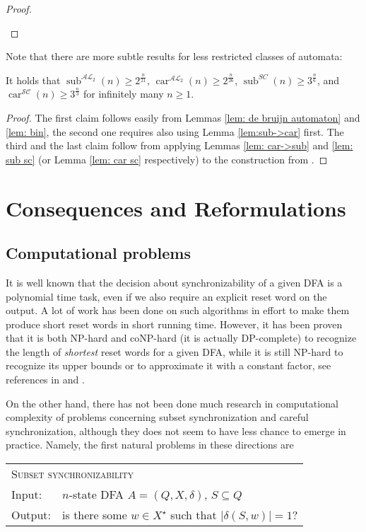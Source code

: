 \documentclass{ws-ijmpc}
\newcommand{\noun}[1]{\textsc{#1}}
\providecommand{\tabularnewline}{\\}
\DeclareMathOperator{\car}{car}
\DeclareMathOperator{\sub}{sub}
\begin{document}
\begin{proof}
\begin{romanlist}
\end{romanlist}
\end{proof}
Note that there are more subtle results for less restricted classes
of automata:
\begin{proposition}
It holds that $\sub^{\mathcal{AL}_{2}}\!\left(n\right)\ge2^{\frac{n}{21}}$,
$\car^{\mathcal{AL}_{2}}\!\left(n\right)\ge2^{\frac{n}{26}}$, $\sub^{SC}\!\left(n\right)\ge3^{\frac{n}{6}}$,
and $\car^{\mathcal{SC}}\!\left(n\right)\ge3^{\frac{n}{3}}$ for infinitely
many $n\ge1$.\end{proposition}
\begin{proof}
The first claim follows easily from Lemmas \ref{lem: de bruijn automaton}
and \ref{lem: bin}, the second one requires also using Lemma \ref{lem:sub->car}
first. The third and the last claim follow from applying Lemmas \ref{lem: car->sub}
and \ref{lem: sub sc} (or Lemma \ref{lem: car sc} respectively)
to the construction from \citep{MAR6}.
\end{proof}

\section{Consequences and Reformulations\label{sec:Consequences-and-reformulations}}


\subsection{Computational problems}

It is well known that the decision about synchronizability of a given
DFA is a polynomial time task, even if we also require an explicit
reset word on the output. A lot of work has been done on such algorithms
in effort to make them produce short reset words in short running
time. However, it has been proven that it is both NP-hard and coNP-hard
(it is actually DP-complete) to recognize the length of \emph{shortest}
reset words for a given DFA, while it is still NP-hard to recognize
its upper bounds or to approximate it with a constant factor, see
references in \citep{OLS1} and \citep{BER4}.

On the other hand, there has not been done much research in computational
complexity of problems concerning subset synchronization and careful
synchronization, although they does not seem to have less chance to
emerge in practice. Namely, the first natural problems in these directions
are 

\begin{flushleft}
\begin{tabular}{ll}
\multicolumn{2}{l}{\noun{Subset synchronizability}}\tabularnewline
Input: & $n$-state DFA $A=\left(Q,X,\delta\right)$, $S\subseteq Q$\tabularnewline
Output: & is there some $w\in X^{\star}$ such that $\left|\delta\!\left(S,w\right)\right|=1$?\tabularnewline
\end{tabular}
\par\end{flushleft}
\end{document}
